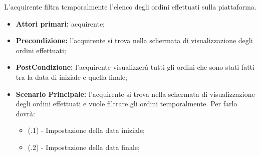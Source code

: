 
L'acquirente filtra temporalmente l'elenco degli ordini effettuati sulla piattaforma.
\begin{itemize}
    \item \textbf{Attori primari:} acquirente;
    \item \textbf{Precondizione:} l'acquirente si trova nella schermata di visualizzazione degli ordini effettuati;
    \item \textbf{PostCondizione:} l'acquirente visualizzerà tutti gli ordini che sono stati fatti tra la data di iniziale e quella finale;
    \item \textbf{Scenario Principale:} l'acquirente si trova nella schermata di visualizzazione degli ordini effettuati e vuole filtrare gli ordini temporalmente. Per farlo dovrà:
    \begin{itemize}
        \item (\actualUC.1) - Impostazione della data iniziale;
        \item (\actualUC.2) - Impostazione della data finale;
    \end{itemize}
\end{itemize}

\resetSubUC

